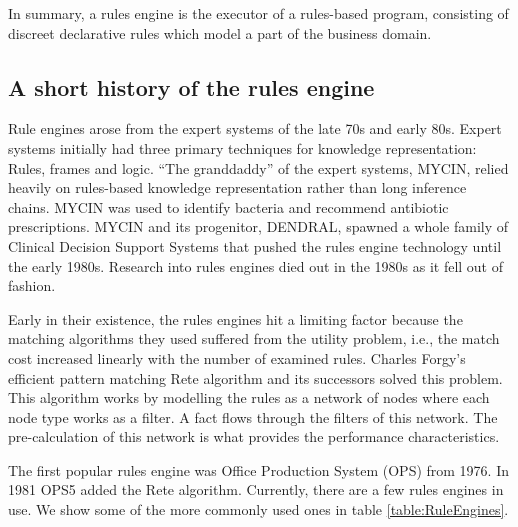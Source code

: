 In summary, a rules engine is the executor of a rules-based program, consisting of discreet declarative rules which model a part of the business domain.

\subsection{A short history of the rules engine}

Rule engines arose from the expert systems of the late 70s and early 80s.
Expert systems initially had three primary techniques for knowledge representation: Rules, frames and logic\cite{jackson1986introduction}.
``The granddaddy'' of the expert systems, MYCIN, relied heavily on rules-based knowledge representation\cite{shortliffe1974mycin} rather than long inference chains.
MYCIN was used to identify bacteria and recommend antibiotic prescriptions.
MYCIN and its progenitor, DENDRAL, spawned a whole family of Clinical Decision Support Systems that pushed the rules engine technology until the early 1980s.
Research into rules engines died out in the 1980s as it fell out of fashion.

Early in their existence, the rules engines hit a limiting factor because the matching algorithms they used suffered from the utility problem, i.e., the match cost increased linearly with the number of examined rules.
Charles Forgy's efficient pattern matching Rete algorithm\cite{forgy1989rete} and its successors solved this problem.
This algorithm works by modelling the rules as a network of nodes where each node type works as a filter.
A fact flows through the filters of this network.
The pre-calculation of this network is what provides the performance characteristics.

The first popular rules engine was Office Production System (OPS) from 1976.
In 1981 OPS5 added the Rete algorithm.
Currently, there are a few rules engines in use.
We show some of the more commonly used ones in table \ref{table:RuleEngines}.

